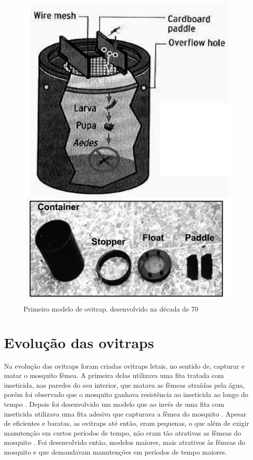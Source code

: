 \documentclass[
	12pt,				%
	openright,			%
	oneside,			%
	a4paper,			%
	chapter=TITLE,		%
	english,			%
	brazil				%
	]{abntex2}
\begin{document}
\begin{figure}[h!]
\centering
\includegraphics[scale=1.6]{imagens/ovitrapLoki.jpg}
\caption{Primeiro modelo de ovitrap, desenvolvido na década de 70}
    \label{fig:OvitrapLoki}
\end{figure}

\section{Evolução das ovitraps}

Na evolução das ovitraps foram criadas ovitraps letais, no sentido de, capturar e matar o mosquito fêmea. A primeira delas utilizava uma fita
tratada com inseticida, nas paredes do seu interior, que matava as fêmeas atraídas pela
água, porém foi observado que o mosquito ganhava resistência ao inseticida ao longo do
tempo \cite{BRIANJJOHNSON2017}. Depois foi desenvolvido um modelo que ao invés de uma fita com inseticida
utilizava uma fita adesiva que capturava a fêmea do mosquito \cite{BRIANJJOHNSON2017}. Apesar de eficientes e 
baratas, as ovitraps até então, eram pequenas, o que além de exigir manutenção em curtos
períodos de tempo, não eram tão atrativas as fêmeas do mosquito \cite{BRIANJJOHNSON2017}. Foi desenvolvido
então, modelos maiores, mais atrativos às fêmeas do mosquito e que demandavam
manutenções em períodos de tempo maiores.
\end{document}
